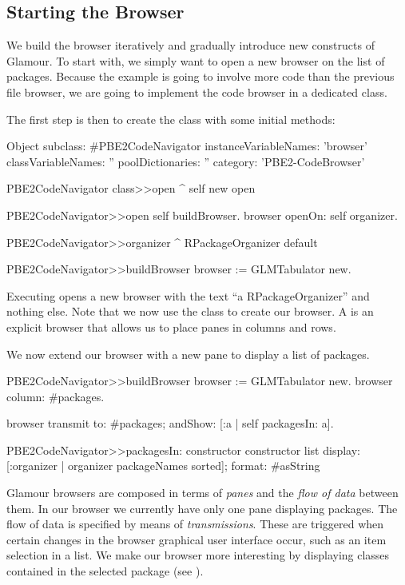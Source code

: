 \documentclass[a4paper,10pt,twoside]{book}
\begin{document}
\subsection{Starting the Browser}

We build the browser iteratively and gradually introduce new
constructs of Glamour. To start with, we simply want to open a new
browser on the list of packages. Because the example is going to
involve more code than the previous file browser, we are going to
implement the code browser in a dedicated class.

The first step is then to create the class with some initial methods:

\begin{code}{}
Object subclass: #PBE2CodeNavigator
  instanceVariableNames: 'browser'
  classVariableNames: ''
  poolDictionaries: ''
  category: 'PBE2-CodeBrowser'

PBE2CodeNavigator class>>open
  ^ self new open

PBE2CodeNavigator>>open
  self buildBrowser.
  browser openOn: self organizer.

PBE2CodeNavigator>>organizer
  ^ RPackageOrganizer default

PBE2CodeNavigator>>buildBrowser
  browser := GLMTabulator new.
\end{code}

Executing  opens a new browser with the text
``a RPackageOrganizer'' and nothing else. Note that we now use the  class to create our browser. A  is an explicit browser that allows us to place panes in columns and rows.


We now extend our browser with a new pane to display a list of packages.


\begin{code}{}
PBE2CodeNavigator>>buildBrowser
  browser := GLMTabulator new.
  browser
    column: #packages.

  browser transmit to: #packages; andShow: [:a | self packagesIn: a].

PBE2CodeNavigator>>packagesIn: constructor
  constructor list
    display: [:organizer | organizer packageNames sorted];
    format: #asString
\end{code}

Glamour browsers are composed in terms of \emph{panes} and the
\emph{flow of data} between them. In our browser we currently have
only one pane displaying packages. The flow of data is specified by
means of \emph{transmissions}. These are triggered when certain
changes in the browser graphical user interface occur, such as an item selection in a list. We make our browser more interesting by displaying classes contained in the selected package (see ).
\end{document}
